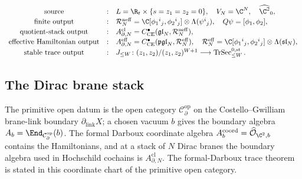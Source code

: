 \documentclass[11pt]{memoir}
\begin{document}
\[
\begin{array}{ccl}
\text{source} &:&
  L=\R_t\times\{s=z_1=z_2=0\},\quad V_N=\C^N,\quad
  \widehat{\C^2}_{0},\\[2pt]
\text{finite output} &:&
  \mathcal R_N^{\mathrm{neff}}=
  \C[\phi_1{}^i{}_j,\phi_2{}^i{}_j]\otimes\Lambda(\psi^i{}_j),
  \quad Q\psi=[\phi_1,\phi_2],\\[2pt]
\text{quotient-stack output} &:&
  A^{\mathrm{cl}}_{\partial,N}
  =C^\bullet_{\mathrm{CE}}(\mathfrak{gl}_N,\mathcal R_N^{\mathrm{neff}}),\\[2pt]
\text{effective Hamiltonian output} &:&
  A^{\mathrm{eff}}_{\partial,N}
  =C^\bullet_{\mathrm{CE}}(\mathfrak{pgl}_N,\mathcal R_N^{\mathrm{eff}}),
  \quad
  \mathcal R_N^{\mathrm{eff}}
  =\C[\phi_1{}^i{}_j,\phi_2{}^i{}_j]\otimes\Lambda(\mathfrak{sl}_N),\\[2pt]
\text{stable trace output} &:&
  J_{\le W}\colon (z_1,z_2)/(z_1,z_2)^{W+1}
  \longrightarrow \operatorname{TrSec}^{0,\mathrm{st}}_{\le W}.
\end{array}
\]

\subsection{The Dirac brane stack}\label{ssec:dirac-brane-stack}

The primitive open datum is the open category
\(\mathcal C^{\mathrm{op}}_\partial\) on the Costello--Gwilliam
brane-link boundary \(\partial_{\mathrm{link}}X\); a chosen vacuum \(b\) gives the
boundary algebra \(A_b=\End_{\mathcal C^{\mathrm{op}}_\partial}(b)\).
The formal Darboux coordinate algebra
  \(A_b^{\mathrm{coord}}=\widehat{\mathcal O}_{\C^2,b}\) contains the
Hamiltonians, and at a stack of \(N\) Dirac branes the boundary algebra
used in Hochschild cochains is \(A^{\mathrm{cl}}_{\partial,N}\).  The
formal-Darboux trace theorem is stated in this coordinate chart of the
primitive open category.
\end{document}
